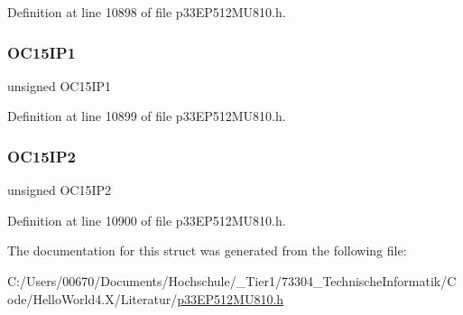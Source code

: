 Definition at line 10898 of file p33\+E\+P512\+M\+U810.\+h.

\mbox{\label{structtag_i_p_c34_b_i_t_s_a588b1bb9540047b95eca9705e1bbf026}} 
\subsubsection{\texorpdfstring{O\+C15\+I\+P1}{OC15IP1}}
{\footnotesize\ttfamily unsigned O\+C15\+I\+P1}



Definition at line 10899 of file p33\+E\+P512\+M\+U810.\+h.

\mbox{\label{structtag_i_p_c34_b_i_t_s_a567fffd20bf6b98fc989338fbe3e0e12}} 
\subsubsection{\texorpdfstring{O\+C15\+I\+P2}{OC15IP2}}
{\footnotesize\ttfamily unsigned O\+C15\+I\+P2}



Definition at line 10900 of file p33\+E\+P512\+M\+U810.\+h.



The documentation for this struct was generated from the following file\+:\begin{DoxyCompactItemize}
\item 
C\+:/\+Users/00670/\+Documents/\+Hochschule/\+\_\+\+Tier1/73304\+\_\+\+Technische\+Informatik/\+Code/\+Hello\+World4.\+X/\+Literatur/\hyperlink{p33_e_p512_m_u810_8h}{p33\+E\+P512\+M\+U810.\+h}\end{DoxyCompactItemize}

